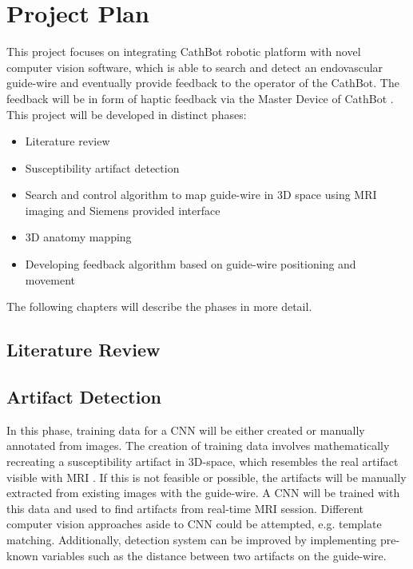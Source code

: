 \documentclass{article}
\begin{document}
\section{Project Plan}
This project focuses on integrating CathBot robotic platform with novel computer vision software, which is able to search and detect an endovascular guide-wire and eventually provide feedback to the operator of the CathBot. The feedback will be in form of haptic feedback via the Master Device of CathBot \cite{cathbot}.
This project will be developed in distinct phases:
\begin{itemize}
    \item Literature review 
    \item Susceptibility artifact detection
    \item Search and control algorithm to map guide-wire in 3D space using MRI imaging and Siemens provided interface
    \item 3D anatomy mapping
    \item Developing feedback algorithm based on guide-wire positioning and movement
\end{itemize}
The following chapters will describe the phases in more detail.

\subsection{Literature Review}


\subsection{Artifact Detection}
\label{artifact_detaction}
In this phase, training data for a CNN will be either created or manually annotated from images. The creation of training data involves mathematically recreating a susceptibility artifact in 3D-space, which resembles the real artifact visible with MRI \cite{sim_of_suscept_artifact}. If this is not feasible or possible, the artifacts will be manually extracted from existing images with the guide-wire.
A CNN will be trained with this data and used to find artifacts from real-time MRI session. Different computer vision approaches aside to CNN could be attempted, e.g. template matching. Additionally, detection system can be improved by implementing pre-known variables such as the distance between two artifacts on the guide-wire.
\end{document}
